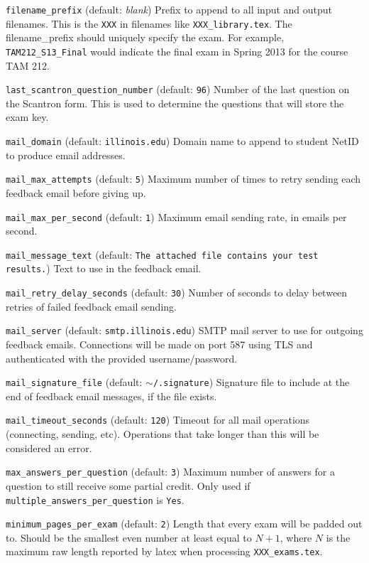\documentclass{article}
\begin{document}
\hangindent=1cm \texttt{filename_prefix} (default: \emph{blank})
Prefix to append to all input and output filenames. This is the
\texttt{XXX} in filenames like \texttt{XXX_library.tex}.  The
filename_prefix should uniquely specify the exam. For example,
\texttt{TAM212_S13_Final} would indicate the final exam in Spring 2013
for the course TAM 212.

\hangindent=1cm \texttt{last_scantron_question_number} (default:
\texttt{96}) Number of the last question on the Scantron form. This is
used to determine the questions that will store the exam key.

\hangindent=1cm \texttt{mail_domain} (default: \texttt{illinois.edu})
Domain name to append to student NetID to produce email addresses.

\hangindent=1cm \texttt{mail_max_attempts} (default: \texttt{5})
Maximum number of times to retry sending each feedback email before
giving up.

\hangindent=1cm \texttt{mail_max_per_second} (default: \texttt{1})
Maximum email sending rate, in emails per second.

\hangindent=1cm \texttt{mail_message_text} (default: \texttt{The
  attached file contains your test results.}) Text to use in the
feedback email.

\hangindent=1cm \texttt{mail_retry_delay_seconds} (default:
\texttt{30}) Number of seconds to delay between retries of failed
feedback email sending.

\hangindent=1cm \texttt{mail_server} (default:
\texttt{smtp.illinois.edu}) SMTP mail server to use for outgoing
feedback emails.  Connections will be made on port 587 using TLS and
authenticated with the provided username/password.

\hangindent=1cm \texttt{mail_signature_file} (default:
\texttt{$\sim$/.signature}) Signature file to include at the end of
feedback email messages, if the file exists.

\hangindent=1cm \texttt{mail_timeout_seconds} (default: \texttt{120})
Timeout for all mail operations (connecting, sending, etc).
Operations that take longer than this will be considered an error.

\hangindent=1cm \texttt{max_answers_per_question} (default:
\texttt{3}) Maximum number of answers for a question to still receive
some partial credit. Only used if
\texttt{multiple_answers_per_question} is \texttt{Yes}.

\hangindent=1cm \texttt{minimum_pages_per_exam} (default: \texttt{2})
Length that every exam will be padded out to. Should be the smallest
even number at least equal to $N + 1$, where $N$ is the maximum raw
length reported by latex when processing \texttt{XXX_exams.tex}.
\end{document}

